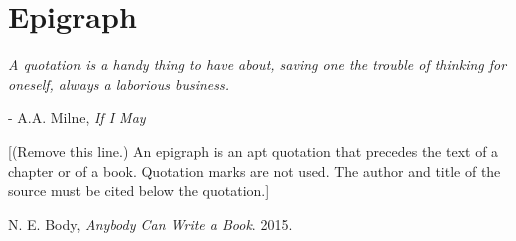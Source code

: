 \documentclass{ucalgarythesis}
\theoremstyle{plain}
\theoremstyle{definition}
\begin{document}
  \chapter{Epigraph}

  \begin{epiquote} 
   \textit{A quotation is a handy thing to have about, saving one the trouble of thinking for oneself, always a laborious business.} 
  \end{epiquote}    
  \begin{flushright} - A.A. Milne, \textit{If I May}\end{flushright}\bigskip
   
  [(Remove this line.) An epigraph is an apt quotation that precedes the text of a chapter or of a book. Quotation marks are not used. The author and title of the source must be cited below the quotation.]



  \mainmatter           %
    
  
    
  



  \cleardoublepage{}

  \begin{thebibliography}{9}

     N. E. Body, {\em Anybody Can Write a Book}. 2015.
    
  \end{thebibliography}
   
\end{document}
